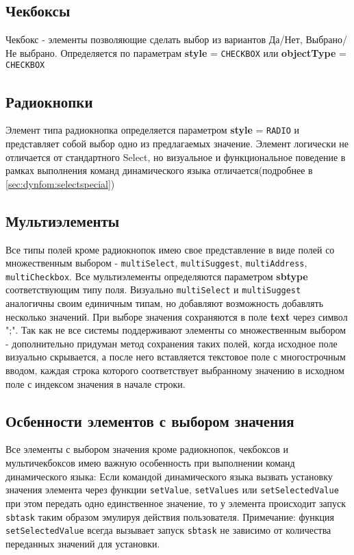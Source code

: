 \documentclass[../index.tex]{subfiles}
\begin{document}
\subsection{Чекбоксы}
	Чекбокс - элементы позволяющие сделать выбор из вариантов Да/Нет, Выбрано/Не выбрано.
	Определяется по параметрам \textbf{style} = \verb|CHECKBOX| или \textbf{objectType} = \verb|CHECKBOX|
\subsection{Радиокнопки}
	Элемент типа радиокнопка определяется параметром \textbf{style} = \verb|RADIO| и представляет собой выбор одно из предлагаемых значение.
	Элемент логически не отличается от стандартного Select, но визуальное и функциональное поведение в рамках выполнения команд динамического языка отличается(подробнее в \autoref{sec:dynfom:selectspecial})
\subsection{Мультиэлементы}
	Все типы полей кроме радиокнопок имею свое представление в виде полей со множественным выбором -  \verb|multiSelect|, \verb|multiSuggest|, \verb|multiAddress|, \verb|multiCheckbox|.
	Все мультиэлементы определяются параметром \textbf{sbtype} соответствующим типу поля. Визуально \verb|multiSelect| и \verb|multiSuggest| аналогичны своим единичным типам, но добавляют возможность добавлять несколько значений.
	При выборе значения сохраняются в поле \textbf{text} через символ ";". Так как не все системы поддерживают элементы со множественным выбором - дополнительно придуман метод сохранения таких полей, когда исходное поле визуально скрывается, а после него вставляется текстовое поле с многострочным вводом, каждая строка которого соответствует выбранному значению в исходном поле с индексом значения в начале строки.
\subsection{Осбенности элементов с выбором значения}\label{sec:dynfom:selectspecial} 
	Все элементы с выбором значения кроме радиокнопок, чекбоксов и мультичекбоксов имею важную особенность при выполнении команд динамического языка: Если командой динамического языка вызвать установку значения элемента через функции \verb|setValue|, \verb|setValues| или \verb|setSelectedValue| при этом передать одно единственное значение, то у элемента происходит запуск \verb|sbtask| таким образом эмулируя действия пользователя.
	Примечание: функция \verb|setSelectedValue| всегда вызывает запуск \verb|sbtask| не зависимо от количества переданных значений для установки.
\section{}
\end{document}
